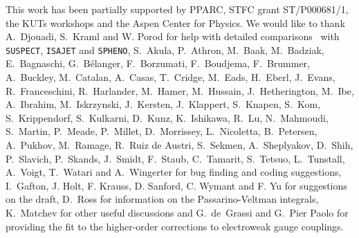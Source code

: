 \documentclass{article}
\begin{document}
\acknowledgments
This work has been partially supported by PPARC, STFC grant ST/P000681/1, the
KUTs workshops and
the Aspen Center for Physics.
We would like to thank
A.~Djouadi, S.~Kraml and W. Porod 
for help with detailed comparisons~\cite{comparison} with 
{\tt SUSPECT}, {\tt ISAJET} and {\tt SPHENO},
S.~Akula, P.~Athron, M.~Baak, M.~Badziak, E.~Bagnaschi,
G.~B\'elanger, F.~Borzumati, F.~Boudjema, F.~Brummer, A.~Buckley, M.~Catalan,
A.~Casas,  T.~Cridge,
M.~Eads, H.~Eberl, J.~Evans, R.~Franceschini, R.~Harlander,
M.~Hamer, M.~Hussain,
J.~Hetherington, M.~Ibe, A.~Ibrahim, M.~Iskrzynski, J.~Kersten, J.~Klappert, S.~Knapen, S.~Kom,
S.~Krippendorf, S.~Kulkarni, D.~Kunz, K.~Ishikawa, 
R.~Lu, N.~Mahmoudi,  S.~Martin, P.~Meade, P.~Millet,
D.~Morrissey, L.~Nicoletta, B.~Petersen,
A.~Pukhov, M.~Ramage,
R.~Ruiz de Austri, 
S.~Sekmen, A.~Sheplyakov, D.~Shih, P.~Slavich, P.~Skands, J.~Smidt, 
F.~Staub, C.~Tamarit, 
S.~Tetsuo, L.~Tunstall, A.~Voigt,
T.~Watari and A.~Wingerter
for bug finding and coding suggestions, I.~Gafton, J. Holt, F. Krauss,
D. Sanford, C. Wymant and F. Yu for
suggestions on the draft, D.~Ross for  
information on the Passarino-Veltman integrals, K.~Matchev for 
other useful discussions and G.~de~Grassi and G.~Pier Paolo for providing the
fit to the higher-order corrections to electroweak gauge couplings.
\end{document}
